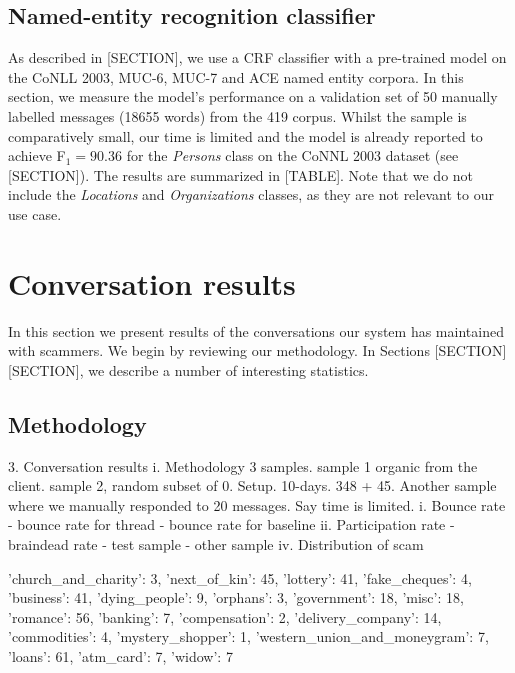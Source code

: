\subsection{Named-entity recognition classifier}
As described in [SECTION], we use a CRF classifier with a pre-trained model on the CoNLL 2003, MUC-6, MUC-7 and ACE named entity corpora. In this section, we measure the model's performance on a validation set of 50 manually labelled messages (18655 words) from the 419 corpus. Whilst the sample is comparatively small, our time is limited and the model is already reported to achieve F$_{1} = 90.36$ for the \emph{Persons} class on the CoNNL 2003 dataset (see [SECTION]). The results are summarized in [TABLE]. Note that we do not include the \emph{Locations} and \emph{Organizations} classes, as they are not relevant to our use case.
\begin{center}
\end{center}

\section{Conversation results}
In this section we present results of the conversations our system has maintained with scammers. We begin by reviewing our methodology. In Sections [SECTION][SECTION], we describe a number of interesting statistics.
\subsection{Methodology}

	3. Conversation results
		i. Methodology 3 samples. sample 1 organic from the client. sample 2, random subset of 
		0. Setup. 10-days. 348 + 45. Another sample where we manually responded to 20 messages. Say time is limited.
		i. Bounce rate
			- bounce rate for thread
			- bounce rate for baseline
		ii. Participation rate
			- braindead rate
			- test sample
			- other sample
		iv. Distribution of scam

{'church_and_charity': 3, 'next_of_kin': 45, 'lottery': 41, 'fake_cheques': 4, 'business': 41, 'dying_people': 9, 'orphans': 3, 'government': 18, 'misc': 18, 'romance': 56, 'banking': 7, 'compensation': 2, 'delivery_company': 14, 'commodities': 4, 'mystery_shopper': 1, 'western_union_and_moneygram': 7, 'loans': 61, 'atm_card': 7, 'widow': 7}

